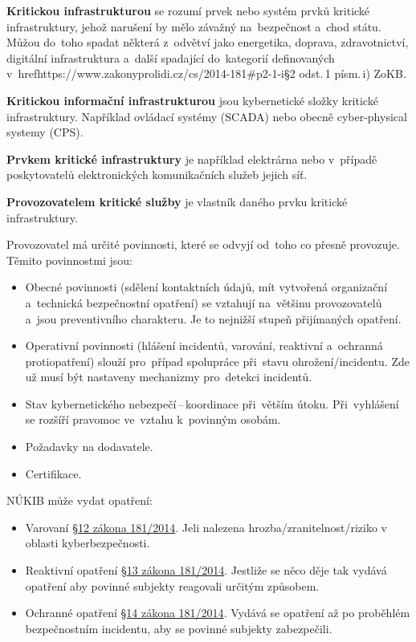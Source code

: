 \textbf{Kritickou infrastrukturou} se rozumí prvek nebo systém prvků kritické infrastruktury, jehož narušení by mělo závažný na~bezpečnost a~chod státu. Můžou do~toho spadat některá z~odvětví jako energetika, doprava, zdravotnictví, digitální infrastruktura a~další spadající do~kategorií definovaných v~href{https://www.zakonyprolidi.cz/cs/2014-181\#p2-1-i}{§2 odst.\,1 písm.\,i) ZoKB}.

\textbf{Kritickou informační infrastrukturou} jsou kybernetické složky kritické infrastruktury. Například ovládací systémy (SCADA) nebo obecně cyber-physical systemy (CPS).

\textbf{Prvkem kritické infrastruktury} je například elektrárna nebo v~případě poskytovatelů elektronických komunikačních služeb jejich síť.

\textbf{Provozovatelem kritické služby} je vlastník daného prvku kritické infrastruktury.

Provozovatel má určité povinnosti, které se odvyjí od~toho co přesně provozuje. Těmito povinnostmi jsou:

\begin{itemize}
    \item Obecné povinnosti (sdělení kontaktních údajů, mít vytvořená organizační a~technická bezpečnostní opatření) se vztahují na~většinu provozovatelů a~jsou preventivního charakteru. Je to nejnižší stupeň přijímaných opatření.
    \item Operativní povinnosti (hlášení incidentů, varování, reaktivní a~ochranná protiopatření) slouží pro~případ spolupráce při~stavu ohrožení/incidentu. Zde už musí být nastaveny mechanizmy pro~detekci incidentů.
    \item Stav kybernetického nebezpečí\,--\,koordinace při~větším útoku. Při~vyhlášení se rozšíří pravomoc ve~vztahu k~povinným osobám.
    \item Požadavky na dodavatele.
    \item Certifikace.
\end{itemize}

NÚKIB může vydat opatření:

\begin{itemize}
    \item Varovaní \href{https://www.zakonyprolidi.cz/cs/2014-181#p12}{§12 zákona 181/2014}. Jeli nalezena hrozba/zranitelnost/riziko v oblasti kyberbezpečnosti. 
    \item Reaktivní opatření \href{https://www.zakonyprolidi.cz/cs/2014-181#p13}{§13 zákona 181/2014}. Jestliže se něco děje tak vydává opatření aby povinné subjekty reagovali určitým způsobem.
    \item Ochranné opatření \href{https://www.zakonyprolidi.cz/cs/2014-181#p14}{§14 zákona 181/2014}. Vydává se opatření až po proběhlém bezpečnostním incidentu, aby se povinné subjekty zabezpečili.
\end{itemize}

